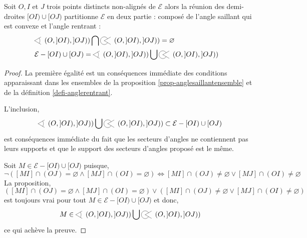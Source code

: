 \begin{thm}
    Soit $O,I$ et $J$ trois points distincts non-alignés de $\mathcal{E}$ alors la réunion des demi-droites $[OI)\cup [OJ)$ partitionne $\mathcal{E}$ en deux partie : composé de l'angle saillant qui est convexe et l'angle rentrant :  
    \begin{align*}
        &\anglesaillant\left({O},{]OI)},{]OJ)}\right) \bigcap \anglerentrant\left({O},{]OI)},{]OJ)}\right) = \varnothing &\\
        &\mathcal{E} - [OI)\cup[OJ) = \anglesaillant\left({O},{]OI)},{]OJ)}\right) \bigcup \anglerentrant\left({O},{]OI)},{]OJ)}\right)&
    \end{align*}
    \begin{proof}
        La première égalité est un conséquences immédiate des conditions apparaissant dans les ensembles de la proposition \ref{prop-anglesaillantensemble} et de la définition \ref{defi-anglerentrant}.

        L'inclusion,
        \begin{equation*}
            \anglesaillant\left({O},{]OI)},{]OJ)}\right) \bigcup \anglerentrant\left({O},{]OI)},{]OJ)}\right) \subset \mathcal{E} - [OI)\cup[OJ)
        \end{equation*}
        est conséquences immédiate du fait que les secteurs d'angles ne contiennent pas leurs supports et que le support des secteurs d'angles proposé est le même. 

        Soit $M\in \mathcal{E} - [OI)\cup[OJ)$ puisque,
        \begin{equation*}
            \neg\left( [MI]\cap(OJ) = \varnothing \wedge [MJ]\cap(OI) = \varnothing \right) \Longleftrightarrow [MI]\cap(OJ) \neq \varnothing \lor [MJ]\cap(OI) \neq \varnothing
        \end{equation*}
        La proposition,
        \begin{equation*}
            \left( [MI]\cap(OJ) = \varnothing \wedge [MJ]\cap(OI) = \varnothing \right) \lor \left([MI]\cap(OJ) \neq \varnothing \lor [MJ]\cap(OI) \neq \varnothing\right)
        \end{equation*}
        est toujours vrai pour tout $M\in \mathcal{E} - [OI)\cup[OJ)$ et donc,
        \begin{equation*}
            M\in \anglesaillant\left({O},{]OI)},{]OJ)}\right) \bigcup \anglerentrant\left({O},{]OI)},{]OJ)}\right)
        \end{equation*}
        ce qui achève la preuve.
    \end{proof}
\end{thm}


